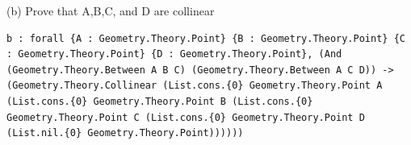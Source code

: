 \begin{theorem}
  \label{Geometry.Ch3.Ex.Ex1.b}
  \leanok
  (b) Prove that A,B,C, and D are collinear 
\begin{verbatim}b : forall {A : Geometry.Theory.Point} {B : Geometry.Theory.Point} {C : Geometry.Theory.Point} {D : Geometry.Theory.Point}, (And (Geometry.Theory.Between A B C) (Geometry.Theory.Between A C D)) -> (Geometry.Theory.Collinear (List.cons.{0} Geometry.Theory.Point A (List.cons.{0} Geometry.Theory.Point B (List.cons.{0} Geometry.Theory.Point C (List.cons.{0} Geometry.Theory.Point D (List.nil.{0} Geometry.Theory.Point))))))\end{verbatim}
\end{theorem}


